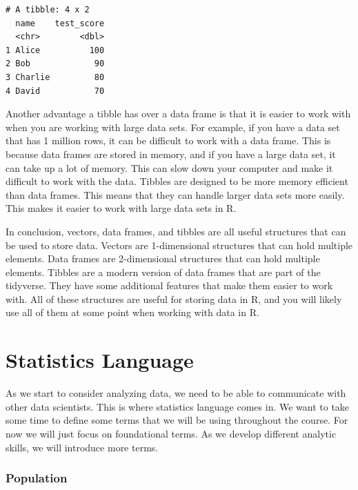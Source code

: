 \documentclass[
  letterpaper,
  DIV=11,
  numbers=noendperiod]{scrreprt}
\begin{document}
\begin{verbatim}
# A tibble: 4 x 2
  name    test_score
  <chr>        <dbl>
1 Alice          100
2 Bob             90
3 Charlie         80
4 David           70
\end{verbatim}

Another advantage a tibble has over a data frame is that it is easier to
work with when you are working with large data sets. For example, if you
have a data set that has 1 million rows, it can be difficult to work
with a data frame. This is because data frames are stored in memory, and
if you have a large data set, it can take up a lot of memory. This can
slow down your computer and make it difficult to work with the data.
Tibbles are designed to be more memory efficient than data frames. This
means that they can handle larger data sets more easily. This makes it
easier to work with large data sets in R.

In conclusion, vectors, data frames, and tibbles are all useful
structures that can be used to store data. Vectors are 1-dimensional
structures that can hold multiple elements. Data frames are
2-dimensional structures that can hold multiple elements. Tibbles are a
modern version of data frames that are part of the tidyverse. They have
some additional features that make them easier to work with. All of
these structures are useful for storing data in R, and you will likely
use all of them at some point when working with data in R.


\chapter*{Statistics Language}\label{statistics-language}


As we start to consider analyzing data, we need to be able to
communicate with other data scientists. This is where statistics
language comes in. We want to take some time to define some terms that
we will be using throughout the course. For now we will just focus on
foundational terms. As we develop different analytic skills, we will
introduce more terms.

\subsection*{Population}\label{population}
\end{document}
